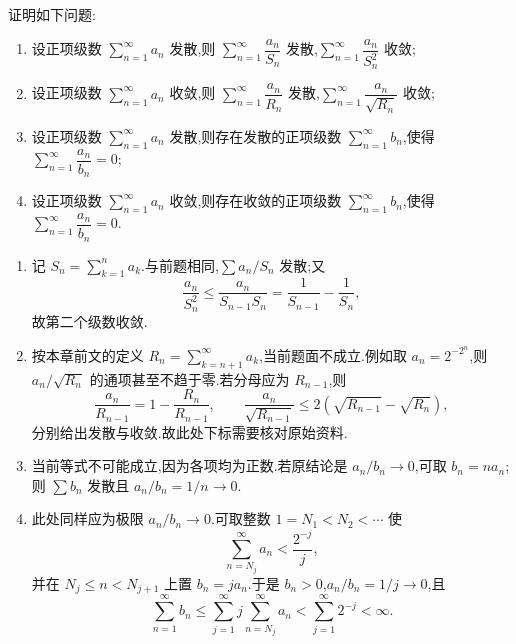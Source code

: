 \begin{example}[\markstar]
    证明如下问题:
    \begin{enumerate}
        \item 设正项级数 $\displaystyle\sum\limits_{n=1}^{\infty}a_n$ 发散,则 $\displaystyle\sum\limits_{n=1}^{\infty}\dfrac{a_n}{S_n}$ 发散,$\displaystyle\sum\limits_{n=1}^{\infty}\dfrac{a_n}{S_n^2}$ 收敛;
        \item 设正项级数 $\displaystyle\sum\limits_{n=1}^{\infty}a_n$ 收敛,则 $\displaystyle\sum\limits_{n=1}^{\infty}\dfrac{a_n}{R_n}$ 发散,$\displaystyle\sum\limits_{n=1}^{\infty}\dfrac{a_n}{\sqrt{R_n}}$ 收敛;
        \item 设正项级数 $\displaystyle\sum\limits_{n=1}^{\infty}a_n$ 发散,则存在发散的正项级数 $\displaystyle\sum\limits_{n=1}^{\infty}b_n$,使得 $\displaystyle\sum\limits_{n=1}^{\infty}\dfrac{a_n}{b_n}=0$;
        \item 设正项级数 $\displaystyle\sum\limits_{n=1}^{\infty}a_n$ 收敛,则存在收敛的正项级数 $\displaystyle\sum\limits_{n=1}^{\infty}b_n$,使得 $\displaystyle\sum\limits_{n=1}^{\infty}\dfrac{a_n}{b_n}=0$.
    \end{enumerate}
\end{example}
\exampleblank

\begin{solution}
    \leavevmode
    \begin{enumerate}
        \item 记 $\displaystyle S_n=\sum_{k=1}^{n}a_k$.与前题相同,$\displaystyle \sum a_n/S_n$ 发散;又
              \[
                  \dfrac{a_n}{S_n^2}
                  \leq\dfrac{a_n}{S_{n-1}S_n}
                  =\dfrac{1}{S_{n-1}}-\dfrac{1}{S_n},
              \]
              故第二个级数收敛.
        \item 按本章前文的定义 $\displaystyle R_n=\sum_{k=n+1}^{\infty}a_k$,当前题面不成立.例如取 $a_n=2^{-2^n}$,则 $a_n/\sqrt{R_n}$ 的通项甚至不趋于零.若分母应为 $R_{n-1}$,则
              \[
                  \dfrac{a_n}{R_{n-1}}=1-\dfrac{R_n}{R_{n-1}},
                  \qquad
                  \dfrac{a_n}{\sqrt{R_{n-1}}}
                  \leq2(\sqrt{R_{n-1}}-\sqrt{R_n}),
              \]
              分别给出发散与收敛.故此处下标需要核对原始资料.
        \item 当前等式不可能成立,因为各项均为正数.若原结论是
              $a_n/b_n\to0$,可取 $b_n=na_n$;则 $\displaystyle \sum b_n$ 发散且 $a_n/b_n=1/n\to0$.
        \item 此处同样应为极限 $a_n/b_n\to0$.可取整数
              $1=N_1<N_2<\cdots$ 使
              \[
                  \displaystyle\sum\limits_{n=N_j}^{\infty}a_n<\dfrac{2^{-j}}{j},
              \]
              并在 $N_j\leq n<N_{j+1}$ 上置 $b_n=ja_n$.于是 $b_n>0$,$a_n/b_n=1/j\to0$,且
              \[
                  \displaystyle\sum\limits_{n=1}^{\infty}b_n
                  \leq\sum\limits_{j=1}^{\infty}j\sum\limits_{n=N_j}^{\infty}a_n
                  <\sum\limits_{j=1}^{\infty}2^{-j}<\infty.
              \]
    \end{enumerate}
\end{solution}

